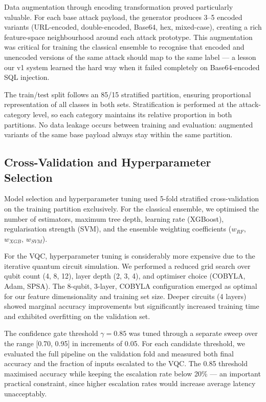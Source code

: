 \documentclass[journal,onecolumn]{IEEEtran}
\begin{document}
Data augmentation through encoding transformation proved particularly valuable. For each base attack payload, the generator produces 3--5 encoded variants (URL-encoded, double-encoded, Base64, hex, mixed-case), creating a rich feature-space neighbourhood around each attack prototype. This augmentation was critical for training the classical ensemble to recognise that encoded and unencoded versions of the same attack should map to the same label --- a lesson our v1 system learned the hard way when it failed completely on Base64-encoded SQL injection.

The train/test split follows an 85/15 stratified partition, ensuring proportional representation of all classes in both sets. Stratification is performed at the attack-category level, so each category maintains its relative proportion in both partitions. No data leakage occurs between training and evaluation: augmented variants of the same base payload always stay within the same partition.

\subsection{Cross-Validation and Hyperparameter Selection}

Model selection and hyperparameter tuning used 5-fold stratified cross-validation on the training partition exclusively. For the classical ensemble, we optimised the number of estimators, maximum tree depth, learning rate (XGBoost), regularisation strength (SVM), and the ensemble weighting coefficients ($w_{RF}$, $w_{XGB}$, $w_{SVM}$).

For the VQC, hyperparameter tuning is considerably more expensive due to the iterative quantum circuit simulation. We performed a reduced grid search over qubit count (4, 8, 12), layer depth (2, 3, 4), and optimiser choice (COBYLA, Adam, SPSA). The 8-qubit, 3-layer, COBYLA configuration emerged as optimal for our feature dimensionality and training set size. Deeper circuits (4 layers) showed marginal accuracy improvements but significantly increased training time and exhibited overfitting on the validation set.

The confidence gate threshold $\gamma = 0.85$ was tuned through a separate sweep over the range [0.70, 0.95] in increments of 0.05. For each candidate threshold, we evaluated the full pipeline on the validation fold and measured both final accuracy and the fraction of inputs escalated to the VQC. The 0.85 threshold maximised accuracy while keeping the escalation rate below 20\% --- an important practical constraint, since higher escalation rates would increase average latency unacceptably.
\end{document}
